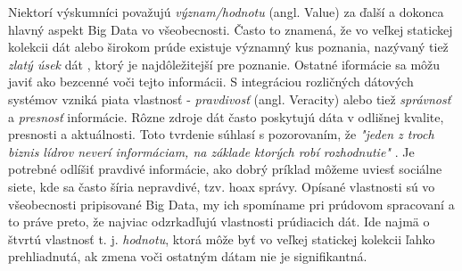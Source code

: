 \newpage
Niektorí výskumníci považujú \textit{význam/hodnotu} (angl. Value) za ďalší a dokonca hlavný aspekt Big Data vo všeobecnosti. Často to znamená, že vo veľkej statickej kolekcii dát alebo širokom prúde existuje významný kus poznania, nazývaný tiež \textit{zlatý úsek} dát \citep{zaslavsky2013sensing}, ktorý je najdôležitejší pre poznanie. Ostatné iformácie sa môžu javiť ako bezcenné voči tejto informácii. S integráciou rozličných dátových systémov vzniká piata vlastnosť - \textit{pravdivosť} (angl. Veracity) alebo tiež \textit{správnosť} a \textit{presnosť} informácie. Rôzne zdroje dát často poskytujú dáta v odlišnej kvalite, presnosti a aktuálnosti. Toto tvrdenie súhlasí s pozorovaním, že \textit{"jeden z troch biznis lídrov neverí informáciam, na základe ktorých robí rozhodnutie"} \citep{dong2013big}. Je potrebné odlíšiť pravdivé informácie, ako dobrý príklad môžeme uviesť sociálne siete, kde sa často šíria nepravdivé, tzv. hoax správy. Opísané vlastnosti sú vo všeobecnosti pripisované Big Data, my ich spomíname pri prúdovom spracovaní a to práve preto, že najviac odzrkadľujú vlastnosti prúdiacich dát. Ide najmä o štvrtú vlastnosť t. j. \textit{hodnotu}, ktorá môže byť vo veľkej statickej kolekcii ľahko prehliadnutá, ak zmena voči ostatným dátam nie je signifikantná.

